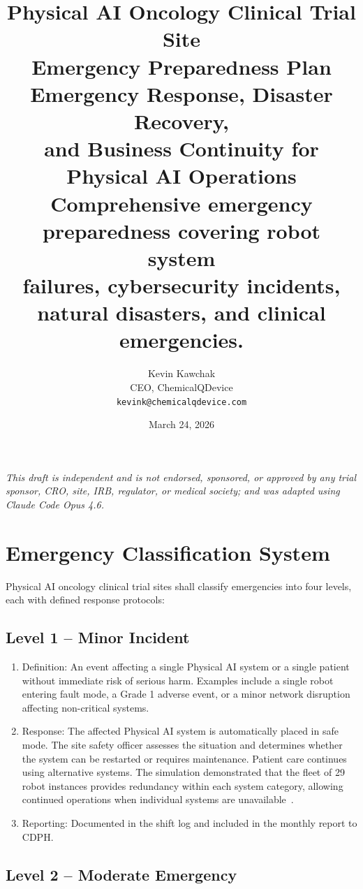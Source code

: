 \documentclass[11pt,letterpaper]{article}
\title{%
  \textbf{Physical AI Oncology Clinical Trial Site}\\
  \textbf{Emergency Preparedness Plan}\\[6pt]
  \large Emergency Response, Disaster Recovery,\\
  and Business Continuity for Physical AI Operations\\[6pt]
  \normalsize Comprehensive emergency preparedness covering robot system\\
  failures, cybersecurity incidents, natural disasters, and clinical emergencies.
}
\author{%
  Kevin Kawchak\\
  CEO, ChemicalQDevice\\
  \texttt{kevink@chemicalqdevice.com}
}
\date{March 24, 2026}
\begin{document}
\maketitle
\thispagestyle{fancy}

\begin{center}
\footnotesize
\textit{This draft is independent and is not endorsed, sponsored, or approved
by any trial sponsor, CRO, site, IRB, regulator, or medical society;
and was adapted using Claude Code Opus 4.6.}
\end{center}

\vspace{1em}
\tableofcontents
\newpage

\section{Emergency Classification System}

Physical AI oncology clinical trial sites shall classify emergencies into four
levels, each with defined response protocols:

\subsection{Level 1 -- Minor Incident}

\begin{enumerate}[label=(\alph*)]
\item Definition: An event affecting a single Physical AI system or a single
  patient without immediate risk of serious harm. Examples include a single
  robot entering fault mode, a Grade 1 adverse event, or a minor network
  disruption affecting non-critical systems.

\item Response: The affected Physical AI system is automatically placed in safe
  mode. The site safety officer assesses the situation and determines whether
  the system can be restarted or requires maintenance. Patient care continues
  using alternative systems. The simulation demonstrated that the fleet of 29
  robot instances provides redundancy within each system category, allowing
  continued operations when individual systems are
  unavailable~\cite{newtrial2026}.

\item Reporting: Documented in the shift log and included in the monthly report
  to CDPH.
\end{enumerate}

\subsection{Level 2 -- Moderate Emergency}
\end{document}
